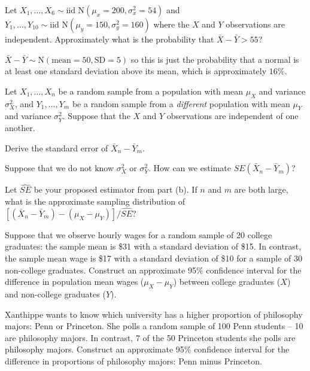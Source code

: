 \documentclass[addpoints,12pt]{exam}
\begin{document}
\begin{questions}

  \question Let $X_1, \dots, X_6 \sim \mbox{iid N}(\mu_x = 200, \sigma_x^2 = 54)$ and $Y_1, \dots, Y_{10} \sim \mbox{iid N}(\mu_y = 150, \sigma_y^2 = 160)$ where the $X$ and $Y$ observations are independent.
  Approximately what is the probability that $\bar{X} - \bar{Y} > 55$? 
  \begin{solution}
    $\bar{X} - \bar{Y} \sim \mbox{N}(\mbox{mean} = 50, \mbox{SD} = 5)$ so this is just the probability that a normal is at least one standard deviation above its mean, which is approximately $16\%$.
  \end{solution}

  \question Let $X_1, \dots, X_n$ be a random sample from a population with mean $\mu_X$ and variance $\sigma_X^2$, and $Y_1, \dots, Y_m$ be a random sample from a \emph{different} population with mean $\mu_Y$ and variance $\sigma_Y^2$. Suppose that the $X$ and $Y$ observations are independent of one another.
  \begin{parts}
  \item Derive the standard error of $\bar{X}_n - \bar{Y}_m$. 
  \item Suppose that we do not know $\sigma_X^2$ or $\sigma_Y^2$. How can we estimate $SE(\bar{X}_n - \bar{Y}_m)$?
  \item Let $\widehat{SE}$ be your proposed estimator from part (b). If $n$ and $m$ are both large, what is the approximate sampling distribution of $[(\bar{X}_n - \bar{Y}_m) - (\mu_X - \mu_Y)]/\widehat{SE}$?
  \end{parts}

  \question Suppose that we observe hourly wages for a random sample of 20 college graduates: the sample mean is \$31 with a standard deviation of \$15.
  In contrast, the sample mean wage is \$17 with a standard deviation of \$10 for a sample of 30 non-college graduates.
  Construct an approximate 95\% confidence interval for the difference in population mean wages ($\mu_X - \mu_Y$) between college graduates ($X$) and non-college graduates ($Y$).

  \question Xanthippe wants to know which university has a higher proportion of philosophy majors: Penn or Princeton.
  She polls a random sample of 100 Penn students -- 10 are philosophy majors.
  In contrast, 7 of the 50 Princeton students she polls are philosophy majors.
  Construct an approximate 95\% confidence interval for the difference in proportions of philosophy majors: Penn minus Princeton.



\end{questions}
\end{document}
